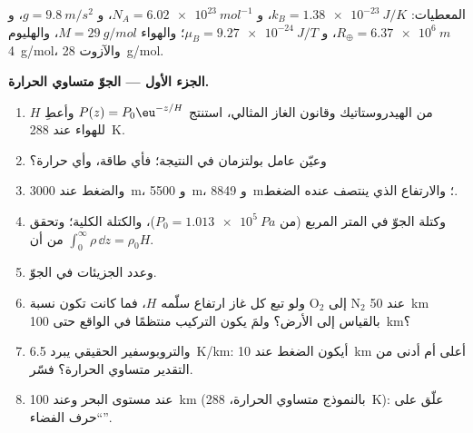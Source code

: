 \begin{problem}\label{pb:b2:boltzmann-factor:1}
المعطيات: $k_B = \qty{1.38e-23}{J/K}$، و $N_A = \qty{6.02e23}{mol^{-1}}$، و $g =
\qty{9.8}{m/s^2}$، و $R_{\oplus} = \qty{6.37e6}{m}$، و $\mu_B = \qty{9.27e-24}{J/T}$؛
والهواء $M = \qty{29}{g/mol}$، والهليوم \qty{4}{g/mol}، والآزوت \qty{28}{g/mol}.

\textbf{الجزء الأول --- الجوّ متساوي الحرارة.}
\begin{enumerate}
  \item من الهيدروستاتيك وقانون الغاز المثالي، استنتج $P(z) =
        P_0\eu^{-z/H}$ وأعطِ $H$ للهواء عند \qty{288}{K}.
  \item وعيّن عامل بولتزمان في النتيجة؛ فأي طاقة،
        وأي حرارة؟
  \item والضغط عند \qty{3000}{m}، و \qty{5500}{m}، و \qty{8849}{m}؛ والارتفاع
        الذي ينتصف عنده الضغط.
  \item وكتلة الجوّ في المتر المربع (من $P_0 =
        \qty{1.013e5}{Pa}$)، والكتلة الكلية؛ وتحقق من أن $\int_0^\infty
        \rho\,\dd z = \rho_0H$.
  \item وعدد الجزيئات في الجوّ.
  \item ولو تبع كل غاز ارتفاع سلّمه $H$، فما كانت تكون نسبة
        O$_2$ إلى N$_2$ عند \qty{50}{km} بالقياس إلى الأرض؟ ولمَ يكون
        التركيب منتظمًا في الواقع حتى \qty{100}{km}؟
  \item والتروبوسفير الحقيقي يبرد \qty{6.5}{K/km}: أيكون الضغط
        عند \qty{10}{km} أعلى أم أدنى من التقدير متساوي الحرارة؟
        فسّر.
  \item {} عند مستوى البحر وعند \qty{100}{km} (بالنموذج
        متساوي الحرارة، \qty{288}{K}): علّق على ``حرف الفضاء''.
\end{enumerate}


\end{problem}

